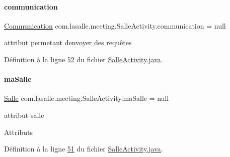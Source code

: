 \paragraph{\texorpdfstring{communication}{communication}}
{\footnotesize\ttfamily \hyperlink{classcom_1_1lasalle_1_1meeting_1_1_communication}{Communication} com.\+lasalle.\+meeting.\+Salle\+Activity.\+communication = null\hspace{0.3cm}{\ttfamily [private]}}



attribut permetant d\textquotesingle{}envoyer des requêtes 



Définition à la ligne \hyperlink{_salle_activity_8java_source_l00052}{52} du fichier \hyperlink{_salle_activity_8java_source}{Salle\+Activity.\+java}.

\mbox{\label{classcom_1_1lasalle_1_1meeting_1_1_salle_activity_a7ae6e92ee66fa15d999f166f40738648}} 
\paragraph{\texorpdfstring{ma\+Salle}{maSalle}}
{\footnotesize\ttfamily \hyperlink{classcom_1_1lasalle_1_1meeting_1_1_salle}{Salle} com.\+lasalle.\+meeting.\+Salle\+Activity.\+ma\+Salle = null\hspace{0.3cm}{\ttfamily [private]}}



attribut salle 

Attributs 

Définition à la ligne \hyperlink{_salle_activity_8java_source_l00051}{51} du fichier \hyperlink{_salle_activity_8java_source}{Salle\+Activity.\+java}.

\mbox{\label{classcom_1_1lasalle_1_1meeting_1_1_salle_activity_aa331ece163b959f06fae00a637d37cb4}} 
